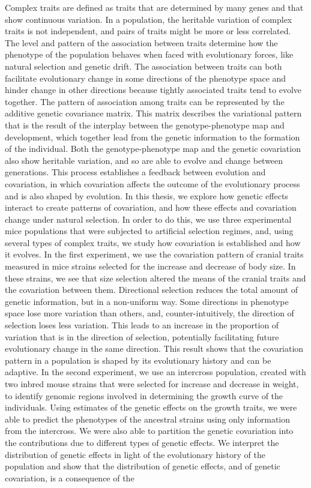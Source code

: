 \noindent
Complex traits are defined as traits that are determined by many genes and that show continuous variation. In a population, the heritable variation of complex traits is not independent, and pairs of traits might be more or less correlated. The level and pattern of the association between traits determine how the phenotype of the population behaves when faced with evolutionary forces, like natural selection and genetic drift. The association between traits can both facilitate evolutionary change in some directions of the phenotype space and hinder change in other directions because tightly associated traits tend to evolve together. The pattern of association among traits can be represented by the additive genetic covariance matrix. This matrix describes the variational pattern that is the result of the interplay between the genotype-phenotype map and development, which together lead from the genetic information to the formation of the individual. Both the genotype-phenotype map and the genetic covariation also show heritable variation, and so are able to evolve and change between generations. This process establishes a feedback between evolution and covariation, in which covariation affects the outcome of the evolutionary process and is also shaped by evolution. In this thesis, we explore how genetic effects interact to create patterns of covariation, and how these effects and covariation change under natural selection. In order to do this, we use three experimental mice populations that were subjected to artificial selection regimes, and, using several types of complex traits, we study how covariation is established and how it evolves. In the first experiment, we use the covariation pattern of cranial traits measured in mice strains selected for the increase and decrease of body size. In these strains, we see that size selection altered the means of the cranial traits and the covariation between them. Directional selection reduces the total amount of genetic information, but in a non-uniform way. Some directions in phenotype space lose more variation than others, and, counter-intuitively, the direction of selection loses less variation. This leads to an increase in the proportion of variation that is in the direction of selection, potentially facilitating future evolutionary change in the same direction. This result shows that the covariation pattern in a population is shaped by its evolutionary history and can be adaptive. In the second experiment, we use an intercross population, created with two inbred mouse strains that were selected for increase and decrease in weight, to identify genomic regions involved in determining the growth curve of the individuals. Using estimates of the genetic effects on the growth traits, we were able to predict the phenotypes of the ancestral strains using only information from the intercross. We were also able to partition the genetic covariation into the contributions due to different types of genetic effects. We interpret the distribution of genetic effects in light of the evolutionary history of the population and show that the distribution of genetic effects, and of genetic covariation, is a consequence of the 